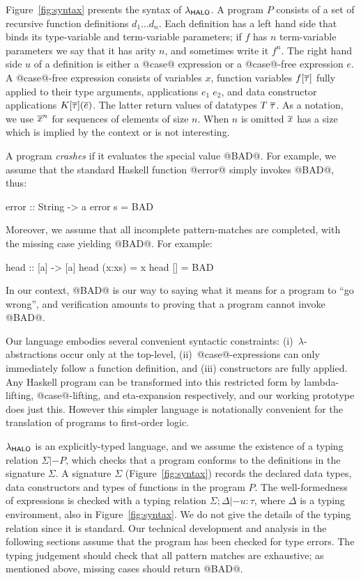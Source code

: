 Figure~\ref{fig:syntax} presents the syntax of $\lambda_{\sf HALO}$.  A program
$P$ consists of a set of recursive function definitions $d_1 \ldots
d_n$. Each definition has a left hand side that binds its type-variable and
term-variable parameters;
if $f$ has $n$ term-variable parameters we say that
it has arity $n$, and sometimes write it $f^n$.
The right hand side $u$ of a definition is either a @case@ expression or a
@case@-free expression $e$.  A @case@-free expression consists of
variables $x$, function variables $f[\overline{\tau}]$ fully applied to their
type arguments, applications $e_1\;e_2$, and data constructor applications
$K[\overline{\tau}](\overline{e})$. The latter return values of datatypes $T\;\overline{\tau}$. As a 
notation, we use $\overline{x}^{n}$ for sequences of elements of size $n$. When $n$ is
omitted $\overline{x}$ has a size which is implied by the context or is not
interesting.

A program \emph{crashes} if it evaluates the special value @BAD@.
For example, we assume that the standard Haskell function @error@
simply invokes @BAD@, thus:
\begin{code}
  error :: String -> a
  error s = BAD
\end{code}
Moreover, we assume that all incomplete pattern-matches are completed, with the
missing case yielding @BAD@.  For example:
\begin{code}
  head :: [a] -> [a]
  head (x:xs) = x
  head []     = BAD
\end{code}
In our context, @BAD@ is our way to saying what it means for a program to ``go wrong'',
and verification amounts to proving that a program cannot invoke @BAD@.

Our language embodies several convenient syntactic constraints:
(i)~$\lambda$-abstractions occur only at the top-level,
(ii)~@case@-expressions can only immediately follow a function
definition, and (iii) constructors are fully applied.
Any Haskell program can be transformed into this restricted
form by lambda-lifting, @case@-lifting, and eta-expansion respectively,
and our working prototype does just this.
However this simpler language is notationally
convenient for the translation of programs to first-order logic.

$\lambda_{\sf HALO}$ is an explicitly-typed language, and we assume the existence
of a typing relation $\Sigma |- P$, which checks that a program
conforms to the definitions in the signature $\Sigma$. A signature
$\Sigma$ (Figure~\ref{fig:syntax}) records the declared data types,
data constructors and types of functions in the program $P$. The
well-formedness of expressions is checked with a typing relation
$\Sigma;\Delta |- u : \tau$, where $\Delta$ is a typing environment,
also in Figure~\ref{fig:syntax}.  We do not give the details of the
typing relation since it is standard.
Our technical development and analysis in the following sections
assume that the program has been checked for type errors.
The typing judgement should check that all pattern matches are
exhaustive; as mentioned above, missing cases should return @BAD@.


